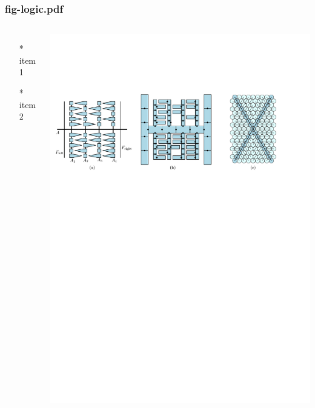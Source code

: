 \begin{frame} \frametitle{fig-logic.pdf}
    \begin{columns}[c]
        \begin{itemize}
            \item[*] item 1
            \item[*] item 2
        \end{itemize}
        \begin{minipage}{\linewidth}
            \begin{center}
            \includegraphics[width=.9\textwidth]{graphics/fig-logic.pdf}
            \label{gfx:fig-logic.pdf}
            \end{center}
        \end{minipage}
    \end{columns}
\end{frame}
